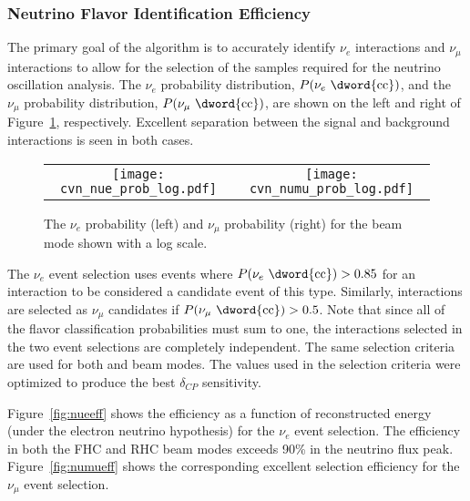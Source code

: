 \subsubsection{Neutrino Flavor Identification Efficiency}
The primary goal of the  algorithm is to accurately identify $\nu_{e}$  interactions and $\nu_{\mu}$  interactions to allow for the selection of the samples required for the neutrino oscillation analysis. The $\nu_{e}$  probability distribution, $P(\nu_e \textrm{ \dword{cc}})$, and the $\nu_\mu$  probability distribution, $P(\nu_\mu \textrm{ \dword{cc}})$, are shown on the left and right of Figure~\ref{fig:cvnprob}, respectively. Excellent separation between the signal and background interactions is seen in both cases.

\begin{figure}
    \centering
    \begin{tabular}{cc}
		\texttt{[image: cvn\_nue\_prob\_log.pdf]} &
		\texttt{[image: cvn\_numu\_prob\_log.pdf]} 
	\end{tabular}
	\caption[The CVN \nue CC probability and \numu CC probability for the FHC beam mode]{The  $\nu_e$  probability (left) and $\nu_\mu$  probability (right) for the  beam mode shown with a log scale.}
    \label{fig:cvnprob}
\end{figure}

The $\nu_e$  event selection uses events where $P(\nu_e \textrm{ \dword{cc}}) > 0.85$ for an interaction to be considered a candidate event of this type. Similarly, interactions are selected as $\nu_\mu$  candidates if $P(\nu_\mu \textrm{ \dword{cc}}) > 0.5$. Note that since all of the flavor classification probabilities must sum to one, the interactions selected in the two event selections are completely independent. The same selection criteria are used for both  and  beam modes. The values used in the selection criteria were optimized to produce the best $\delta_{CP}$ sensitivity.

Figure~\ref{fig:nueeff} shows the efficiency as a function of reconstructed energy (under the electron neutrino hypothesis) for the $\nu_e$ event selection. The efficiency in both the FHC and RHC beam modes exceeds 90\% in the neutrino flux peak.  
Figure~\ref{fig:numueff} shows the corresponding excellent selection efficiency for the $\nu_\mu$ event selection.

